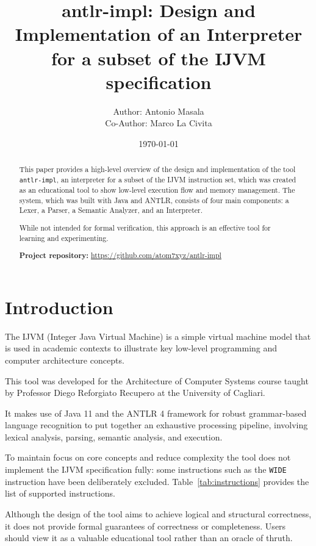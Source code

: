 \documentclass[11pt]{article}
\title{antlr-impl: Design and Implementation of an Interpreter for a subset of the IJVM specification}
\author{
    Author: Antonio Masala\\
    Co-Author: Marco La Civita
}
\date{\today}
\begin{document}
\maketitle

\begin{abstract}
This paper provides a high-level overview of the design and implementation of the tool \texttt{antlr-impl}, an interpreter for a subset of the IJVM instruction set, which was created as an educational tool to show low-level execution flow and memory management. 
The system, which was built with Java and ANTLR, consists of four main components: a Lexer, a Parser, a Semantic Analyzer, and an Interpreter. 

While not intended for formal verification, this approach is an effective tool for learning and experimenting.

\vspace{2em}
\noindent
\textbf{Project repository:} \url{https://github.com/atom7xyz/antlr-impl}
\end{abstract}

\newpage

\section{Introduction}
The IJVM (Integer Java Virtual Machine) is a simple virtual machine model that is used in academic contexts to illustrate key low-level programming and computer architecture concepts.  

This tool was developed for the Architecture of Computer Systems course taught by Professor Diego Reforgiato Recupero at the University of Cagliari. 

It makes use of Java 11 and the ANTLR 4 framework for robust grammar-based language recognition to put together an exhaustive processing pipeline, involving lexical analysis, parsing, semantic analysis, and execution.

To maintain focus on core concepts and reduce complexity the tool does not implement the IJVM specification fully: some instructions such as the  \texttt{WIDE} instruction have been deliberately excluded. Table~\ref{tab:instructions} provides the list of supported instructions.

Although the design of the tool aims to achieve logical and structural correctness, it does not provide formal guarantees of correctness or completeness. Users should view it as a valuable educational tool rather than an oracle of thruth.
\end{document}
